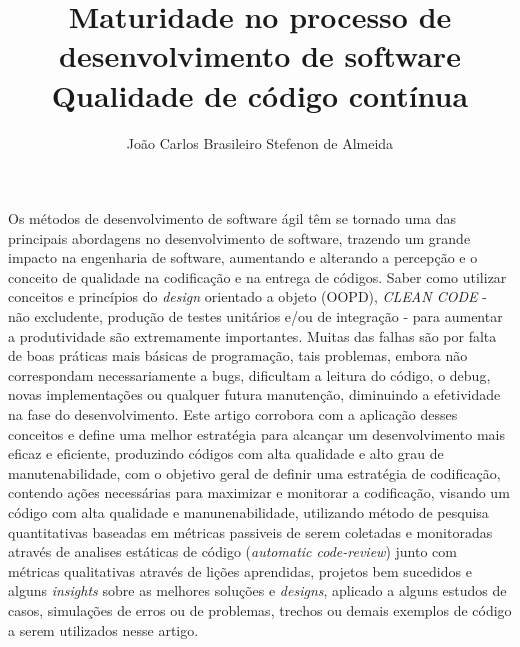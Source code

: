 \documentclass[12pt]{article}
\title{Maturidade no processo de desenvolvimento de software\\ Qualidade de código contínua }
\author{João Carlos Brasileiro Stefenon de Almeida\inst{1}}
\begin{document}
 


\maketitle

  
\begin{resumo} 
Os métodos de desenvolvimento de software ágil têm se tornado uma das principais abordagens no desenvolvimento de software, trazendo um grande impacto na engenharia de software, aumentando e alterando a percepção e o conceito de qualidade na codificação e na entrega de códigos.
Saber como utilizar conceitos e princípios do \textit{design} orientado a objeto (OOPD), \textit{CLEAN CODE} - não excludente, produção de testes unitários e/ou de integração - para aumentar a produtividade são extremamente importantes.
Muitas das falhas são por falta de boas práticas mais básicas de programação, tais problemas, embora não correspondam necessariamente a bugs, dificultam a leitura do código, o debug, novas implementações ou qualquer futura manutenção, diminuindo a efetividade na fase do desenvolvimento.
Este artigo corrobora com a aplicação desses conceitos e define uma melhor estratégia para alcançar um desenvolvimento mais eficaz e eficiente, produzindo códigos com alta qualidade e alto grau de manutenabilidade, com o objetivo geral de definir uma estratégia de codificação, contendo ações necessárias para maximizar e monitorar a codificação, visando um código com alta qualidade e manunenabilidade, utilizando método de pesquisa quantitativas baseadas em métricas passiveis de serem coletadas e monitoradas através de analises estáticas de código (\textit{automatic code-review}) junto com métricas qualitativas através de lições aprendidas, projetos   bem sucedidos e alguns \textit{insights} sobre as melhores soluções e \textit{designs}, aplicado a alguns estudos de casos, simulações de erros ou de problemas, trechos ou demais exemplos de código a serem utilizados nesse artigo. 
\end{resumo}
\end{document}
